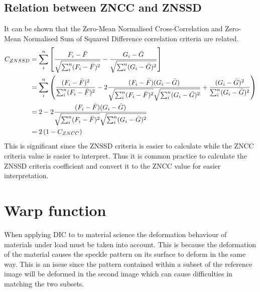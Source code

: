 \documentclass[[12pt,oneside,openany,a4paper, %
\newcommand*\mean[1]{\bar{#1}} %
\begin{document}
\subsection{Relation between ZNCC and ZNSSD}
It can be shown that the Zero-Mean Normalised Cross-Correlation and Zero-Mean Normalised Sum of Squared Difference correlation criteria are related.
\begin{align}
  C_{ZNSSD} &= \sum_i^n \left[ \frac{F_i - \mean{F}}{\sqrt{\sum_i^n (F_i-\mean{F})^2}} - \frac{G_i - \mean{G}}{\sqrt{\sum_i^n (G_i-\mean{G})^2}} \right] \\
  &= \sum_i^n \left( \frac{(F_i-\mean{F})^2}{\sum_i^n (F_i-\mean{F})^2} - 2 \frac{(F_i-\mean{F})(G_i-\mean{G})}{\sqrt{\sum_i^n (F_i-\mean{F})^2} \sqrt{\sum_i^n (G_i-\mean{G})^2}} + \frac{(G_i-\mean{G})^2}{\sum_i^n (G_i-\mean{G})^2} \right) \\
  &= 2 - 2 \frac{(F_i-\mean{F})(G_i-\mean{G})}{\sqrt{\sum_i^n (F_i-\mean{F})^2} \sqrt{\sum_i^n (G_i-\mean{G})^2}}\\
  &= 2 \left( 1- C_{ZNCC} \right)
\end{align}
This is significant since the ZNSSD criteria is easier to calculate while the ZNCC criteria value is easier to interpret. Thus it is common practice to calculate the ZNSSD criteria coefficient and convert it to the ZNCC value for easier interpretation.


\section{Warp function}
When applying DIC to to material science the deformation behaviour of materials under load must be taken into account. This is because the deformation of the material causes the speckle pattern on its surface to deform in the same way. This is an issue since the pattern contained within a subset of the reference image will be deformed in the second image which can cause difficulties in matching the two subsets.
\end{document}
